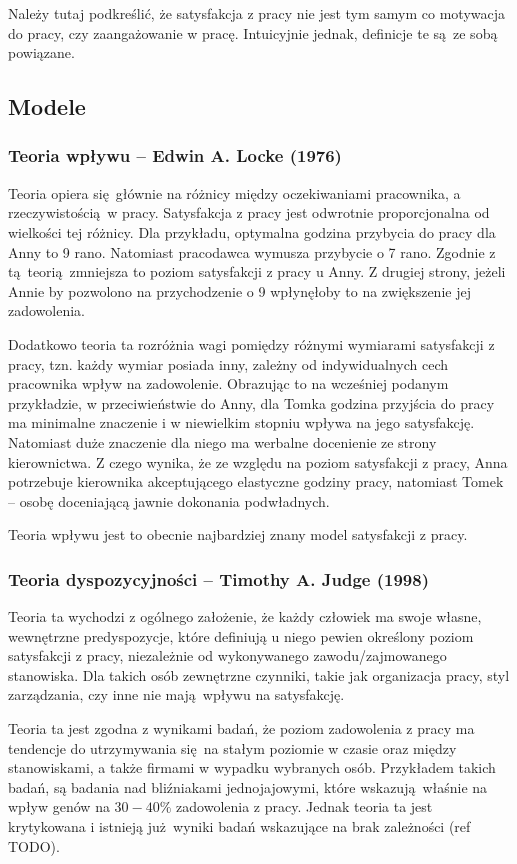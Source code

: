 Należy tutaj podkreślić, że satysfakcja z pracy nie jest tym samym co motywacja do pracy, czy zaangażowanie w pracę. Intuicyjnie jednak, definicje te są ze sobą powiązane.

\subsection{Modele}
\subsubsection{Teoria wpływu -- Edwin A. Locke (1976)}

Teoria opiera się głównie na różnicy między oczekiwaniami pracownika, a rzeczywistością w pracy. Satysfakcja z pracy jest odwrotnie proporcjonalna od wielkości tej różnicy. Dla przykładu, optymalna godzina przybycia do pracy dla Anny to 9 rano. Natomiast pracodawca wymusza przybycie o 7 rano. Zgodnie z tą teorią zmniejsza to poziom satysfakcji z pracy u Anny. Z drugiej strony, jeżeli Annie by pozwolono na przychodzenie o 9 wpłynęłoby to na zwiększenie jej zadowolenia.

Dodatkowo teoria ta rozróżnia wagi pomiędzy różnymi wymiarami satysfakcji z pracy, tzn. każdy wymiar posiada inny, zależny od indywidualnych cech pracownika wpływ na zadowolenie. Obrazując to na wcześniej podanym przykładzie, w przeciwieństwie do Anny, dla Tomka godzina przyjścia do pracy ma minimalne znaczenie i w niewielkim stopniu wpływa na jego satysfakcję. Natomiast duże znaczenie dla niego ma werbalne docenienie ze strony kierownictwa. Z czego
wynika, że ze względu na poziom satysfakcji z pracy, Anna potrzebuje kierownika akceptującego elastyczne godziny pracy, natomiast Tomek -- osobę doceniającą jawnie dokonania podwładnych.

Teoria wpływu jest to obecnie najbardziej znany model satysfakcji z pracy.

\subsubsection{Teoria dyspozycyjności -- Timothy A. Judge (1998)}
Teoria ta wychodzi z ogólnego założenie, że każdy człowiek ma swoje własne, wewnętrzne predyspozycje, które definiują u niego pewien określony poziom satysfakcji z pracy, niezależnie od wykonywanego zawodu/zajmowanego stanowiska. Dla takich osób zewnętrzne czynniki, takie jak organizacja pracy, styl zarządzania, czy inne nie mają wpływu na satysfakcję.

Teoria ta jest zgodna z wynikami badań, że poziom zadowolenia z pracy ma tendencje do utrzymywania się na stałym poziomie w czasie oraz między stanowiskami, a także firmami w wypadku wybranych osób. Przykładem takich badań, są badania nad bliźniakami jednojajowymi, które wskazują właśnie na wpływ genów na $ 30-40\% $ zadowolenia z pracy. Jednak teoria ta jest krytykowana i istnieją już wyniki badań wskazujące na brak zależności (ref TODO).

